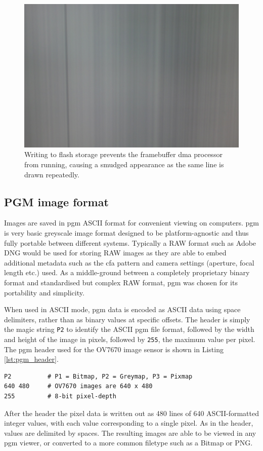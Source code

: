 
\begin{figure}
  \centering
  \includegraphics[width=1\textwidth]{./img/interrupt_smudge.jpg}
  \caption{Writing to flash storage prevents the framebuffer \gls{dma} processor from running, causing a smudged appearance as the same line is drawn repeatedly.}
  \label{fig:interrupt_smudge}
\end{figure}

\subsection{PGM image format}
Images are saved in \gls{pgm} ASCII format for convenient viewing on computers. \gls{pgm} is very basic greyscale image format designed to be platform-agnostic and thus fully portable between different systems. Typically a RAW format such as Adobe DNG would be used for storing RAW images as they are able to embed additional metadata such as the \gls{cfa} pattern and camera settings (aperture, focal length etc.) used. As a middle-ground between a completely proprietary binary format and standardised but complex RAW format, \gls{pgm} was chosen for its portability and simplicity.

When used in ASCII mode, \gls{pgm} data is encoded as ASCII data using space delimiters, rather than as binary values at specific offsets. The header is simply the magic string \texttt{P2} to identify the ASCII \gls{pgm} file format, followed by the width and height of the image in pixels, followed by \texttt{255}, the maximum value per pixel. The \gls{pgm} header used for the OV7670 image sensor is shown in Listing \ref{lst:pgm_header}.

\begin{lstlisting}[caption={\gls{pgm} file header.}, label={lst:pgm_header}]
P2          # P1 = Bitmap, P2 = Greymap, P3 = Pixmap
640 480     # OV7670 images are 640 x 480
255         # 8-bit pixel-depth
\end{lstlisting}

After the header the pixel data is written out as 480 lines of 640 ASCII-formatted integer values, with each value corresponding to a single pixel. As in the header, values are delimited by spaces. The resulting images are able to be viewed in any \gls{pgm} viewer, or converted to a more common filetype such as a Bitmap or PNG.